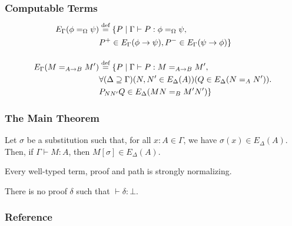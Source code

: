 \documentclass[handout]{beamer}
\newcommand{\eqdef}{\mathrel{\smash{\stackrel{\text{def}}{=}}}}
\begin{document}
\begin{frame}
\frametitle{Computable Terms}
\begin{align*}
E_\Gamma(\phi =_\Omega \psi) & \eqdef \{ P \mid \Gamma \vdash P : \phi =_\Omega \psi, \\
& P^+ \in E_\Gamma(\phi \rightarrow \psi), P^- \in E_\Gamma(\psi \rightarrow \phi) \} \\
\\
E_\Gamma(M =_{A \rightarrow B} M') & \eqdef \{ P \mid \Gamma \vdash P : M =_{A \rightarrow B} M', \\
& \forall (\Delta \supseteq \Gamma) (N, N' \in E_\Delta(A)) (Q \in E_\Delta(N =_A N')). \\
& P_{NN'}Q \in E_\Delta(MN =_B M'N') \}
\end{align*}
\end{frame}

\begin{frame}
\frametitle{The Main Theorem}

\begin{theorem}
Let $\sigma$ be a substitution such that, for all $x : A \in \Gamma$, we have $\sigma(x) \in E_\Delta(A)$.
Then, if $\Gamma \vdash M : A$, then $M [ \sigma ] \in E_\Delta(A)$.
\end{theorem}


\begin{corollary}
Every well-typed term, proof and path is strongly normalizing.
\end{corollary}


\begin{corollary}[Consistency]
There is no proof $\delta$ such that $\vdash \delta : \bot$.
\end{corollary}
\end{frame}

\begin{frame}
\frametitle{Reference}

\end{frame}
\end{document}
